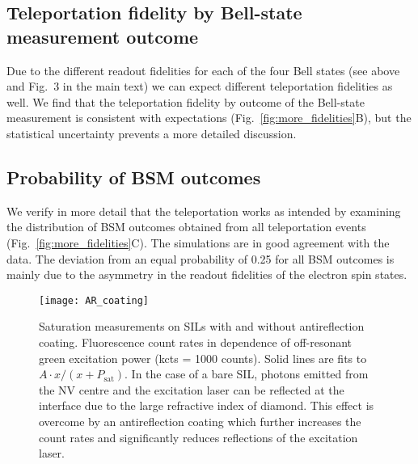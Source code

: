 \subsection{Teleportation fidelity by Bell-state measurement outcome}

Due to the different readout fidelities for each of the four Bell states (see above and Fig.~3 in the main text) we can expect different teleportation fidelities as well. We find that the teleportation fidelity by outcome of the Bell-state measurement is consistent with expectations (Fig.~\ref{fig:more_fidelities}B), but the statistical uncertainty prevents a more detailed discussion.

\subsection{Probability of BSM outcomes}


We verify in more detail that the teleportation works as intended by examining the distribution of BSM outcomes obtained from all teleportation events (Fig.~\ref{fig:more_fidelities}C). The simulations are in good agreement with the data. The deviation from an equal probability of 0.25 for all BSM outcomes is mainly due to the asymmetry in the readout fidelities of the electron spin states\cite{Robledo:2011fs}.

\clearpage

\begin{figure*}[p]
    \texttt{[image: AR\_coating]}
    \caption{
    \label{fig:AR-SIL}
    Saturation measurements on SILs with and without antireflection coating. 
    Fluorescence count rates in dependence of off-resonant green excitation power (kcts = 1000 counts). Solid lines are fits to $A \cdot x / (x + P_\text{sat})$. In the case of a bare SIL, photons emitted from the NV centre and the excitation laser can be reflected at the interface due to the large refractive index of diamond. This effect is overcome by an antireflection coating which further increases the count rates and significantly reduces reflections of the excitation laser.
    }
\end{figure*}

\clearpage

